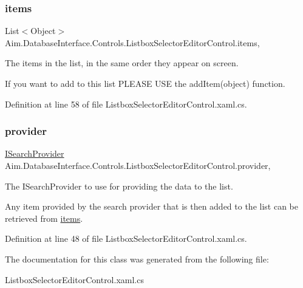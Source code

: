 \subsubsection{\texorpdfstring{items}{items}}
{\footnotesize\ttfamily List$<$Object$>$ Aim.\+Database\+Interface.\+Controls.\+Listbox\+Selector\+Editor\+Control.\+items\hspace{0.3cm}{\ttfamily [get]}, {\ttfamily [set]}}



The items in the list, in the same order they appear on screen. 

If you want to add to this list P\+L\+E\+A\+SE U\+SE the add\+Item(object) function. 

Definition at line 58 of file Listbox\+Selector\+Editor\+Control.\+xaml.\+cs.

\mbox{\label{class_aim_1_1_database_interface_1_1_controls_1_1_listbox_selector_editor_control_a8134970f3f55df8df50e1496d4dcc1bb}} 
\subsubsection{\texorpdfstring{provider}{provider}}
{\footnotesize\ttfamily \mbox{\hyperlink{interface_aim_1_1_database_interface_1_1_interfaces_1_1_i_search_provider}{I\+Search\+Provider}} Aim.\+Database\+Interface.\+Controls.\+Listbox\+Selector\+Editor\+Control.\+provider\hspace{0.3cm}{\ttfamily [get]}, {\ttfamily [set]}}



The I\+Search\+Provider to use for providing the data to the list. 

Any item provided by the search provider that is then added to the list can be retrieved from \mbox{\hyperlink{class_aim_1_1_database_interface_1_1_controls_1_1_listbox_selector_editor_control_ad1de3dde9f4b18186482336335f7efc2}{items}}. 

Definition at line 48 of file Listbox\+Selector\+Editor\+Control.\+xaml.\+cs.



The documentation for this class was generated from the following file\+:\begin{DoxyCompactItemize}
\item 
Listbox\+Selector\+Editor\+Control.\+xaml.\+cs\end{DoxyCompactItemize}
